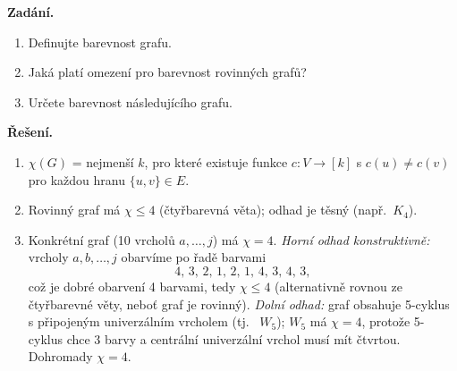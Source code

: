 \documentclass[11pt,a4paper]{article}
\newcommand{\chrom}{\chi}
\begin{document}
\begin{priklad} \par
\textbf{Zadání.}
\begin{enumerate}[label=(\arabic*)]
  \item Definujte barevnost grafu.
  \item Jaká platí omezení pro barevnost rovinných grafů?
  \item Určete barevnost následujícího grafu.
\end{enumerate}

\begin{center}
\end{center}

\textbf{Řešení.}
\begin{enumerate}[label=(\arabic*)]
  \item $\chrom(G)$ = nejmenší $k$, pro které existuje funkce $c\colon V\to[k]$ s $c(u)\ne c(v)$ pro každou hranu $\{u,v\}\in E$.
  \item Rovinný graf má $\chrom\le 4$ (čtyřbarevná věta); odhad je těsný (např.\ $K_4$).
  \item Konkrétní graf (10 vrcholů $a,\dots,j$) má $\chrom=4$. \emph{Horní odhad konstruktivně:} vrcholy $a,b,\dots,j$ obarvíme po řadě barvami
  \[ 4,\,3,\,2,\,1,\,2,\,1,\,4,\,3,\,4,\,3, \]
  což je dobré obarvení 4 barvami, tedy $\chrom\le 4$ (alternativně rovnou ze čtyřbarevné věty, neboť graf je rovinný). \emph{Dolní odhad:} graf obsahuje 5-cyklus s připojeným univerzálním vrcholem (tj.\  $W_5$); $W_5$ má $\chrom=4$, protože 5-cyklus chce 3 barvy a centrální univerzální vrchol musí mít čtvrtou. Dohromady $\chrom=4$.
\end{enumerate}
\end{priklad}
\end{document}
